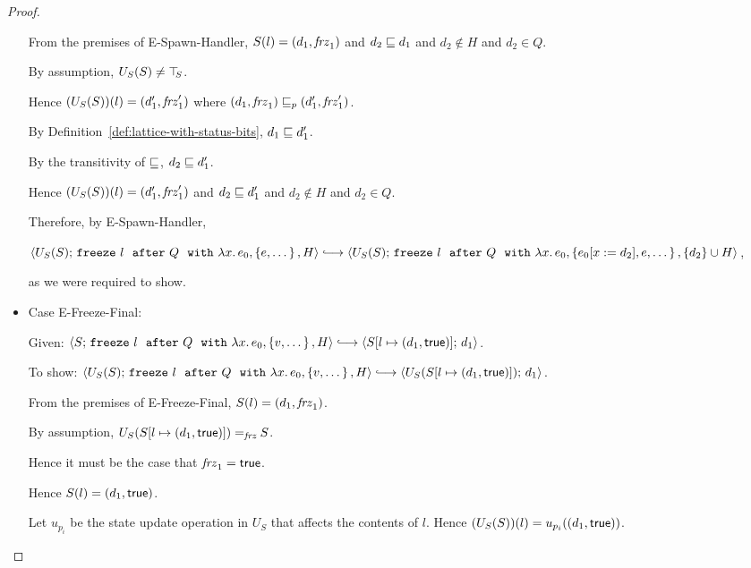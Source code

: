 \begin{proof}
\begin{itemize}
      From the premises of {\sc E-Spawn-Handler}, $S(l) =
      (d_1, \mathit{frz}_1)$ and $d_2 \sqsubseteq d_1$ and $d_2 \notin
      H$ and $d_2 \in Q$.

      By assumption, $U_S(S) \neq \top\hspace{-0.85mm}_{S}$.

      Hence $(U_S(S))(l) = (d'_1, \mathit{frz}'_1)$ where
      $(d_1, \mathit{frz}_1) \sqsubseteq_p (d'_1, \mathit{frz}'_1)$.

      By Definition~\ref{def:lattice-with-status-bits}, $d_1 \sqsubseteq
      d'_1$.

      By the transitivity of $\sqsubseteq$, $d_2 \sqsubseteq d'_1$.

      Hence $(U_S(S))(l) = (d'_1, \mathit{frz}'_1)$ and $d_2 \sqsubseteq
      d'_1$ and $d_2 \notin H$ and $d_2 \in Q$.

      Therefore, by {\sc E-Spawn-Handler},

      $\config{U_S(S)}{\freezeafterfull{l}{Q}{\lam{x}{e_0}}{\setof{e,
            \dots}}{H}} \parstepsto
      \config{U_S(S)}{\freezeafterfull{l}{Q}{\lam{x}{e_0}}{\setof{\subst{e_0}{x}{d_2},
            e, \dots}} {\{d_2\}\cup H}}$,

      as we were required to show.

    \item Case {\sc E-Freeze-Final}:


      Given:
      $\config{S}{\freezeafterfull{l}{Q}{\lam{x}{e_0}}{\setof{v,
            \dots}}{H}} \parstepsto
      \config{\extS{S}{l}{d_1}{\frozentrue}}{d_1}$.

      To show:
      $\config{U_S(S)}{\freezeafterfull{l}{Q}{\lam{x}{e_0}}{\setof{v,
            \dots}}{H}} \parstepsto
      \config{U_S(\extS{S}{l}{d_1}{\frozentrue})}{d_1}$.

      From the premises of {\sc E-Freeze-Final}, $S(l) =
      (d_1, \mathit{frz}_1)$.

      By assumption, $U_S(S[l \mapsto (d_1, \textsf{true})]) =_{\textit{frz}} S$.

      Hence it must be the case that $\mathit{frz}_1 = \textsf{true}$.

      Hence $S(l) = (d_1, \textsf{true})$.

      Let $u_{p_i}$ be the state update operation in $U_S$ that
      affects the contents of $l$.  Hence $(U_S(S))(l) =
      u_{p_i}((d_1, \textsf{true}))$.


\end{itemize}
\end{proof}
